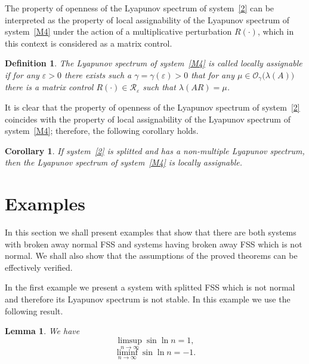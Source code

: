 \documentclass[11pt]{article}
\newtheorem{corollary}[theorem]{Corollary}
\newtheorem{lemma}[theorem]{Lemma}
\newtheorem{definition}[theorem]{Definition}
\begin{document}
The property of openness of the Lyapunov spectrum of system~\eqref{2} can be interpreted as
the property of local assignability of the Lyapunov spectrum of system~\eqref{M4} under
the action of a multiplicative perturbation $R(\cdot)$,
which in this context is considered as a matrix control.


\begin{definition}
\label{lokupr}
The Lyapunov spectrum of system~\eqref{M4} is called \emph{locally assignable} if for any $\varepsilon>0$ there exists such
a $\gamma=\gamma(\varepsilon)>0$ that for any $\mu\in\mathcal O_{\gamma}\bigl(\lambda(A)\bigr)$ there is
a matrix control $R(\cdot)\in\mathcal{R}_{\varepsilon}$ such that $\lambda(AR)=\mu$.
\end{definition}


It is clear that the property of openness of the Lyapunov spectrum of system~\eqref{2}
coincides with the property of local assignability of the Lyapunov spectrum of system~\eqref{M4}; therefore, the following corollary holds.

\begin{corollary}
\it
If system~\eqref{2} is splitted and has a non-multiple Lyapunov spectrum,
then the Lyapunov spectrum of system~\eqref{M4} is locally assignable.
\end{corollary}










\section{Examples} \label{sect7}

In this section we shall present examples that show that there are both
systems with broken away normal FSS and systems having broken away FSS which
is not normal. We shall also show that the assumptions of the proved
theorems can be effectively verified.

In the first example we present a system with splitted FSS which is not
normal and therefore its Lyapunov spectrum is not stable. In this example we
use the following result.

\begin{lemma}
\it
We have%
\begin{equation}
\limsup_{n\to \infty }\sin \ln n=1,
\label{sin1}
\end{equation}%
\begin{equation}
\liminf_{n\to \infty }\sin \ln n=-1. 
\label{sin2}
\end{equation}
\end{lemma}
\end{document}
